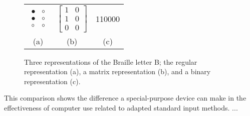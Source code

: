 \begin{figure}[h!]

	\centering

\begin{tabular}{c c c}

$
\begin{array}{cc}
\bullet & \circ \\
\bullet & \circ \\
\circ & \circ \end{array}
$

&

$
\left[ \begin{array}{cc}
1 & 0 \\
1 & 0 \\
0 & 0 \end{array} \right]
$ 

&

110000 \\

(a) & (b) & (c)

\end{tabular}


	\caption{Three representations of the Braille letter B; the regular representation (a), a matrix representation (b), and a binary representation (c).}

\end{figure}

This comparison shows the difference a special-purpose device can make in the effectiveness of computer use related to adapted standard input methods. ...